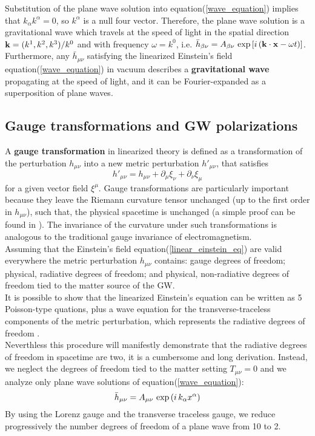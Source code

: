 Substitution of the plane wave solution into equation(\ref{wave_equation}) implies that $k_{\alpha} k^{\alpha} =0$, so $k^{\alpha}$ is a null four vector. 
Therefore, the plane wave solution is a gravitational wave which travels at the speed of light in the spatial direction $\vb{k} = (k^{1},k^{2},k^{3})/k^{0}$ and with frequency $\omega=k^{0} $, i.e. $\bar{h}_{\beta \nu} = A_{\beta \nu} \, \exp\qty[i\, (\vb{k} \cdot \vb{x} - \omega t)]$.
Furthermore, any $\bar{h}_{\mu \nu}$ satisfying the linearized Einstein's field equation(\ref{wave_equation}) in vacuum describes a \textbf{gravitational wave} propagating at the speed of light, and it can be Fourier-expanded as a superposition of plane waves.\\

\subsection{Gauge transformations and GW polarizations}
A \textbf{gauge transformation} in linearized theory is defined as a transformation of the perturbation $h_{\mu \nu}$ into a new metric perturbation $h'_{\mu \nu}$, that satisfies
\begin{equation}
\label{gauge_transf}
h' _{\mu \nu} = h_{\mu \nu} + \partial_\mu \xi _{\nu} + \partial_\nu \xi _{\mu}
\end{equation}
for a given vector field $\xi^\mu$.
Gauge transformations are particularly important because they leave the Riemann curvature tensor unchanged (up to the first order in $h_{\mu \nu}$), such that, the physical spacetime is unchanged (a simple proof can be found in \cite{carroll_spacetime_2003}). 
The invariance of the curvature under such transformations is analogous to the traditional gauge invariance of electromagnetism.\\
Assuming that the Einstein's field equation(\ref{linear_einstein_eq}) are valid everywhere the metric perturbation $h_{\mu \nu}$ contains: gauge degrees of freedom; physical, radiative degrees of freedom; and physical, non-radiative degrees of freedom tied to the matter source of the GW. \\
 It is possible to show that the linearized Einstein's equation can be written as 5 Poisson-type quations, plus a wave equation for the transverse-traceless components of the metric perturbation, which represents the radiative degrees of freedom \cite{flanagan_basics_2005,carroll_spacetime_2003}.\\
 Neverthless this procedure will manifestly demonstrate that the radiative degrees of freedom in spacetime are two, it is a cumbersome and long derivation.
Instead, we neglect the degrees of freedom tied to the matter setting $T_{\mu \nu} =0$ and we analyze only plane wave solutions of equation(\ref{wave_equation}):
\[
\bar{h}_{\mu \nu} = A_{\mu \nu} \, \exp\qty(i\, k_{\alpha} x^{\alpha})
\]
By using the Lorenz gauge and the transverse traceless gauge, we reduce progressively the number degrees of freedom of a plane wave from 10 to 2.\\

